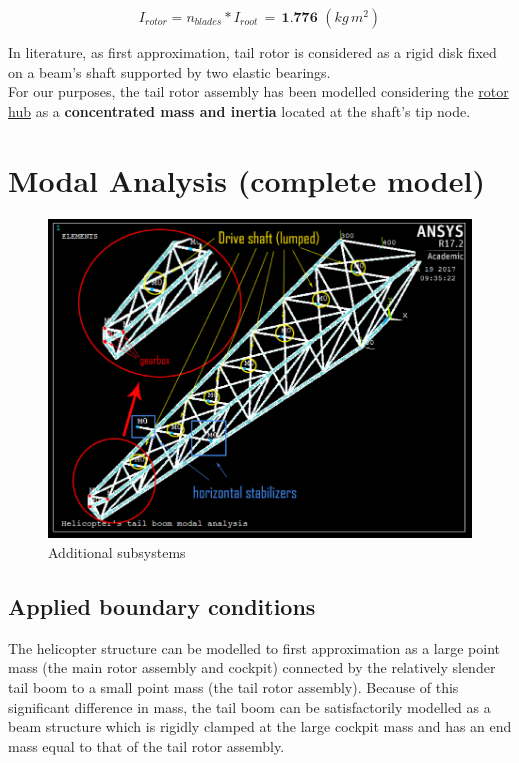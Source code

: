 \begin{equation*}
I_{rotor} = n_{blades} * I_{root} \, = \,  \textbf{1.776} \, \, (kg \, m^2)
\end{equation*}

\noindent
In literature, as first approximation, tail rotor is considered as a rigid disk fixed on a beam's shaft supported by two elastic bearings. \\
For our purposes, the tail rotor assembly has been modelled considering the \underline{rotor hub} as a \textbf{concentrated mass and inertia} located at the shaft's tip node.




\clearpage
\section*{Modal Analysis (complete model)}

\begin{figure}[h!]
	\begin{center}
		\centering  		 		
		\includegraphics[width=0.9\linewidth]{PICTURES/2_Lama_truss/PNG/model2/lumped_approach1.png}
	\end{center}
	\caption{Additional subsystems}
\end{figure}	



\subsection*{Applied boundary conditions}
\noindent
The helicopter structure can be modelled to first approximation as a large point mass (the main rotor assembly and cockpit) connected by the relatively slender tail boom to a small point mass (the tail rotor assembly). Because of this significant difference in mass, the tail boom can be satisfactorily modelled as a beam structure which is rigidly clamped at the large cockpit mass and has an end mass equal to that of the tail rotor assembly. \\

